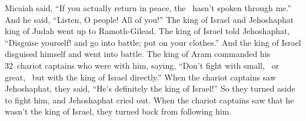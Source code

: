 \begin{inparaenum}
   Micaiah said, ``If you actually return in peace, the \lord\ hasn't spoken through me.'' And he said, ``Listen, O people! All of you!''%
   The king of Israel and Jehoshaphat king of Judah went up to Ramoth-Gilead.%
   The king of Israel told Jehoshaphat, ``Disguise yourself! and go into battle; put on your clothes.'' And the king of Israel disguised himself and went into battle.%
   The king of Aram commanded his 32~chariot captains who were with him, saying, ``Don't fight with small,\
  or great,\
  but with the king of Israel directly.''%
  \vrs{22:32} When the chariot captains saw Jehoshaphat, they said, ``He's definitely the king of Israel!'' So they turned aside to fight him, and Jehoshaphat cried out.%
  \vrs{22:33} When the chariot captains saw that he wasn't the king of Israel, they turned back from following him.%


\end{inparaenum}
